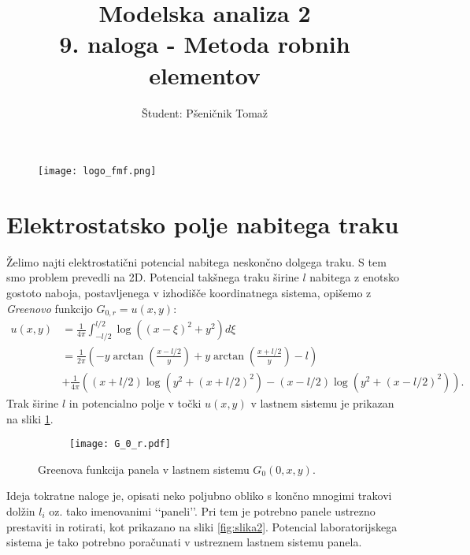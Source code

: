 \documentclass[12pt,a4paper]{article}
\title{\textbf{Modelska analiza 2} \\ 9. naloga - Metoda robnih elementov \\}
\author{Študent: Pšeničnik Tomaž}
\begin{document}

	\begin{figure} [h]
  \centering
  \texttt{[image: logo\_fmf.png]}
  \maketitle
\end{figure}
	
	
	
	\newpage
	
	

\section*{Elektrostatsko polje nabitega traku }

Želimo najti elektrostatični potencial nabitega neskončno dolgega traku. S tem smo problem prevedli na 2D. Potencial takšnega traku širine $l$ nabitega z enotsko gostoto naboja, postavljenega v izhodišče koordinatnega sistema, opišemo z \textit{Greenovo} funkcijo $G_{0,r}=u(x,y)$:
\begin{align} \label{eq:enacba1}
u(x,y)&=\frac{1}{4 \pi} \int _{-l/2} ^{l/2} \log((x -\xi)^{2} + y^{2}) d\xi  \\&= \frac{1}{2\pi} \left( -y \arctan\left( \frac{x - l/2}{y} \right)  +y \arctan\left( \frac{x + l/2}{y} \right) -l \right) \nonumber \\
 &+ \frac{1}{4 \pi} \left(  (x+l/2) \log (y^{2} + (x+l/2)^{2})  - (x-l/2) \log (y^{2} + (x-l/2)^{2}) \right). \nonumber
\end{align}
Trak širine $l$ in potencialno polje v točki $u(x,y)$ v lastnem sistemu je prikazan na sliki  \ref{fig:slika1}.

\begin{figure}[H]
    \centering
    \begin{subfigure}[b]{0.35\textwidth}  			
        \texttt{[image: G\_0\_r.pdf]}
    \end{subfigure}
    \caption{Greenova funkcija  panela v lastnem sistemu $G_0(0,x ,y)$.} \label{fig:slika1}
\end{figure}

\noindent Ideja tokratne naloge je, opisati neko poljubno obliko s končno mnogimi trakovi dolžin $l_i$ oz. tako imenovanimi ‘‘paneli’’. Pri tem je potrebno panele ustrezno prestaviti in rotirati, kot prikazano na sliki \ref{fig:slika2}. Potencial laboratorijskega sistema je tako potrebno poračunati v ustreznem lastnem sistemu panela.
\end{document}
